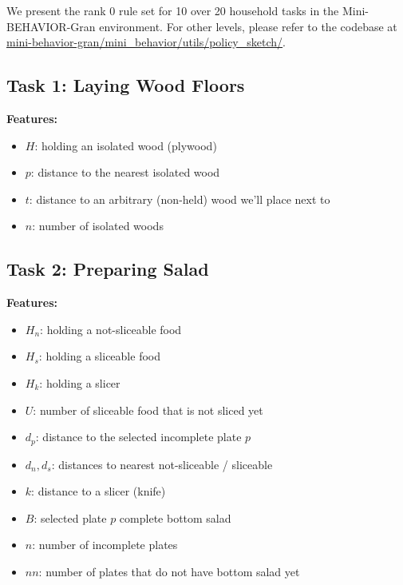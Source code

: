 We present the rank 0 rule set for 10 over 20 household tasks in the Mini-BEHAVIOR-Gran environment. For other levels, please refer to the codebase at \url{mini-behavior-gran/mini_behavior/utils/policy_sketch/}. 

\subsection{Task 1: Laying Wood Floors}

\textbf{Features:}
\begin{itemize}[noitemsep]
    \item $H$: holding an isolated wood (plywood)
    \item $p$: distance to the nearest isolated wood
    \item $t$: distance to an arbitrary (non-held) wood we'll place next to
    \item $n$: number of isolated woods
\end{itemize}

\subsection{Task 2: Preparing Salad}

\textbf{Features:}
\begin{itemize}[noitemsep]
    \item $H_n$: holding a not-sliceable food
    \item $H_s$: holding a sliceable food
    \item $H_k$: holding a slicer
    \item $U$: number of sliceable food that is not sliced yet
    \item $d_p$: distance to the selected incomplete plate $p$
    \item $d_n, d_s$: distances to nearest not-sliceable / sliceable
    \item $k$: distance to a slicer (knife)
    \item $B$: selected plate $p$ complete bottom salad
    \item $n$: number of incomplete plates
    \item $nn$: number of plates that do not have bottom salad yet
\end{itemize}

